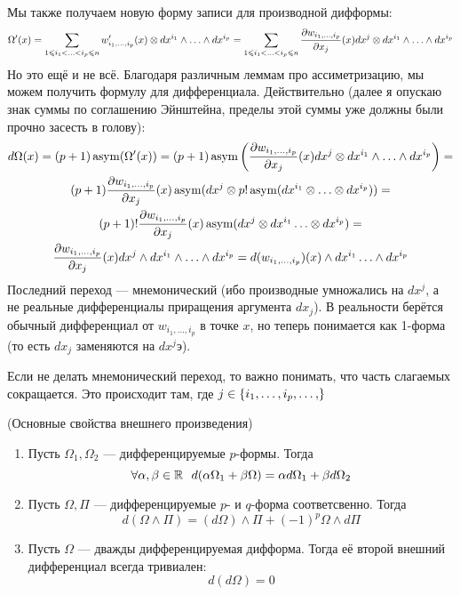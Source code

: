 \begin{note}
	Мы также получаем новую форму записи для производной дифформы:
	\[
		\Omega'(x) = \sum_{1 \leqslant i_1 < \ldots < i_p \leqslant n} w'_{i_1, \ldots, i_p}(x) \otimes dx^{i_1} \wedge \ldots \wedge dx^{i_p} = \sum_{1 \leqslant i_1 < \ldots < i_p \leqslant n} \frac{\partial w_{i_1, \ldots, i_p}}{\partial x_j}(x) dx^j \otimes dx^{i_1} \wedge \ldots \wedge dx^{i_p}
	\]
	Но это ещё и не всё. Благодаря различным леммам про ассиметризацию, мы можем получить формулу для дифференциала. Действительно (далее я опускаю знак суммы по соглашению Эйнштейна, пределы этой суммы уже должны были прочно засесть в голову):
	\begin{multline*}
		d\Omega(x) = (p + 1)\operatorname{asym}(\Omega'(x)) = (p + 1) \operatorname{asym}\left(\frac{\partial w_{i_1, \ldots, i_p}}{\partial x_j}(x)dx^j \otimes dx^{i_1} \wedge \ldots \wedge dx^{i_p}\right) =
		\\
		(p + 1) \frac{\partial w_{i_1, \ldots, i_p}}{\partial x_j}(x) \operatorname{asym}(dx^j \otimes p!\operatorname{asym}(dx^{i_1} \otimes \ldots \otimes dx^{i_p})) =
		\\
		(p + 1)! \frac{\partial w_{i_1, \ldots, i_p}}{\partial x_j}(x) \operatorname{asym}(dx^{j} \otimes dx^{i_1} \ldots \otimes dx^{i_p}) =
		\\
		\frac{\partial w_{i_1, \ldots, i_p}}{\partial x_j}(x) dx^j \wedge dx^{i_1} \wedge \ldots \wedge dx^{i_p} = d(w_{i_1, \ldots, i_p})(x) \wedge dx^{i_1} \ldots \wedge dx^{i_p}
	\end{multline*}
	Последний переход --- мнемонический (ибо производные умножались на $dx^j$, а не реальные дифференциалы приращения аргумента $dx_j$). В реальности берётся обычный дифференциал от $w_{i_1, \ldots, i_p}$ в точке $x$, но теперь понимается как 1-форма (то есть $dx_j$ заменяются на $dx^jэ$).
\end{note}

\begin{note}
	Если не делать мнемонический переход, то важно понимать, что часть слагаемых сокращается. Это происходит там, где $j \in \range{i_1, \ldots, i_p}$
\end{note}

\begin{theorem} (Основные свойства внешнего произведения)
	\begin{enumerate}
		\item Пусть $\Omega_1, \Omega_2$ --- дифференцируемые $p$-формы. Тогда
		\[
			\forall \alpha, \beta \in \R\ \ d(\alpha\Omega_1 + \beta\Omega) = \alpha d\Omega_1 + \beta d\Omega_2
		\]
		
		\item Пусть $\Omega, \Pi$ --- дифференцируемые $p$- и $q$-форма соответсвенно. Тогда
		\[
			d(\Omega \wedge \Pi) = (d\Omega) \wedge \Pi + (-1)^p \Omega \wedge d\Pi
		\]
		
		\item Пусть $\Omega$ --- дважды дифференцируемая дифформа. Тогда её второй внешний дифференциал всегда тривиален:
		\[
			d(d\Omega) = 0
		\]
	\end{enumerate}
\end{theorem}

